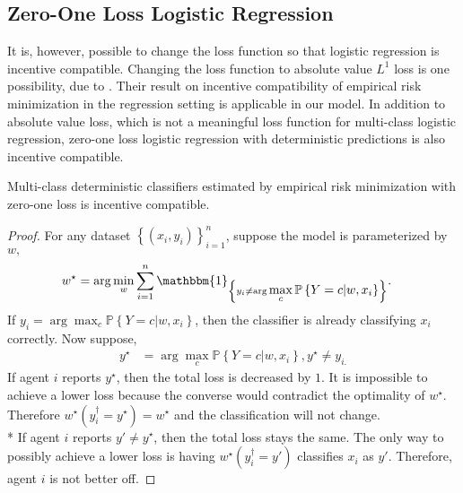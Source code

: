 \documentclass{article}
\begin{document}
\subsection{Zero-One Loss Logistic Regression}
It is, however, possible to change the loss function so that logistic regression is incentive compatible. Changing the loss function to absolute value $L^{1}$ loss is one possibility, due to \citet*{dekel2010incentive}. Their result on incentive compatibility of empirical risk minimization in the regression setting is applicable in our model. In addition to absolute value loss, which is not a meaningful loss function for multi-class logistic regression, zero-one loss logistic regression with deterministic predictions is also incentive compatible.
\newline \newline
\begin{prop} \label{prop:zolog} 
Multi-class deterministic classifiers estimated by empirical risk minimization with zero-one loss is incentive compatible.
\end{prop}
\begin{proof} \label{proof:zologpf} 
For any dataset $\left\{\left(x_{i}, y_{i}\right)\right\}_{i=1}^{n}$, suppose the model is parameterized by $w, $
\begin{align*}
w^\star  &= \arg\displaystyle\min_{w} \displaystyle\sum_{i=1}^{n} \mathbbm{1}_{\left\{y_{i} \neq  \arg\displaystyle\max_{c} \mathbb{P}\left\{Y = c| w, x_{i}\right\}\right\}}.
\end{align*}
If $y_{i} = \arg\displaystyle\max_{c} \mathbb{P}\left\{Y = c| w, x_{i}\right\}$, then the classifier is already classifying $x_{i}$ correctly. Now suppose,
\begin{align*}
y^\star  &= \arg\displaystyle\max_{c} \mathbb{P}\left\{Y = c| w, x_{i}\right\}, y^\star  \neq  y_{i.}
\end{align*}
If agent $i $ reports $y^\star $, then the total loss is decreased by $1$. It is impossible to achieve a lower loss because the converse would contradict the optimality of $w^\star $. Therefore $w^\star \left(y^{\dagger}_{i} = y^\star \right) = w^\star $ and the classification will not change.
\\* If agent $i $ reports $y' \neq  y^\star $, then the total loss stays the same. The only way to possibly achieve a lower loss is having $w^\star \left(y^{\dagger}_{i} = y'\right)$ classifies $x_{i}$ as $y'$. Therefore, agent $i $ is not better off.
\newline \newline\end{proof}
\end{document}

